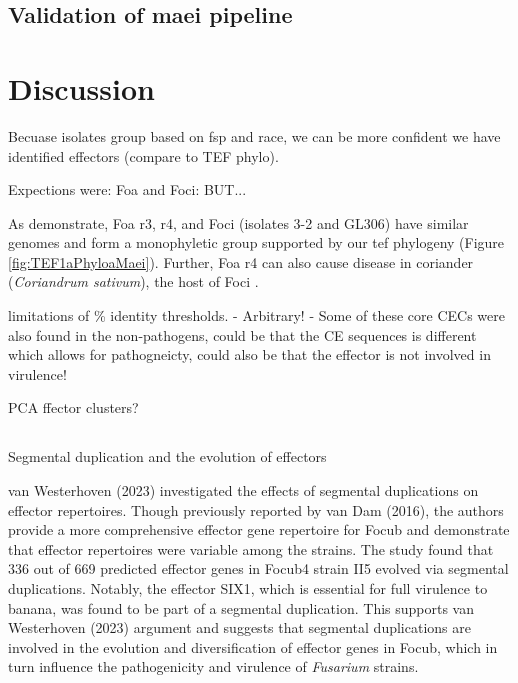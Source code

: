 \subsection{Validation of \acl{maei} pipeline}

\newpage
\section{Discussion}

Becuase isolates group based on fsp and race, we can be more confident we have identified effectors (compare to TEF phylo).

    Expections were: Foa and Foci: BUT...

    As \textcite{Henry2020} demonstrate, \ac{Foa} \ac{r3}, \ac{r4}, and \ac{Foci} (isolates 3-2 and GL306) have similar genomes and form a monophyletic group supported by our \ac{tef} phylogeny (Figure \ref{fig:TEF1aPhyloaMaei}). Further, \ac{Foa} \ac{r4} can also cause disease in coriander (\textit{Coriandrum sativum}), the host of \ac{Foci} \parencite{Epstein2022}. 

limitations of \% identity thresholds. 
 - Arbitrary! 
 - Some of these core CECs were also found in the non-pathogens, could be that the CE sequences is different which allows for pathogneicty, could also be that the effector is not involved in virulence!

PCA ffector clusters?

\subsection{}{Segmental duplication and the evolution of effectors}

van Westerhoven \et (2023) investigated the effects of segmental duplications on effector repertoires.  Though previously reported by van Dam \et (2016), the authors provide a more comprehensive effector gene repertoire for \ac{Focub} and demonstrate that effector repertoires were variable among the strains. The study found that 336 out of 669 predicted effector genes in \ac{Focub4} strain II5 evolved via segmental duplications. Notably, the effector SIX1, which is essential for full virulence to banana, was found to be part of a segmental duplication. This supports van Westerhoven \et (2023) argument and suggests that segmental duplications are involved in the evolution and diversification of effector genes in \ac{Focub}, which in turn influence the pathogenicity and virulence of \textit{Fusarium} strains.


